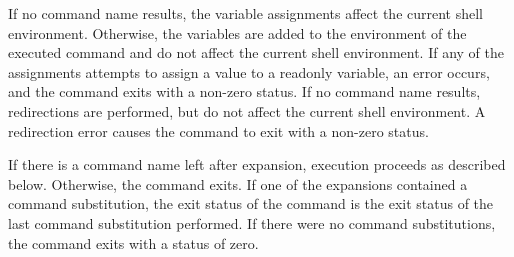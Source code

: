If no command name results, the variable assignments affect the current shell environment. Otherwise, the variables are added to the environment of the executed command and do not affect the current shell environment. If any of the assignments attempts to assign a value to a readonly variable, an error occurs, and the command exits with a non-zero status.
If no command name results, redirections are performed, but do not affect the current shell environment. A redirection error causes the command to exit with a non-zero status.

If there is a command name left after expansion, execution proceeds as described below. Otherwise, the command exits. If one of the expansions contained a command substitution, the exit status of the command is the exit status of the last command substitution performed. If there were no command substitutions, the command exits with a status of zero.